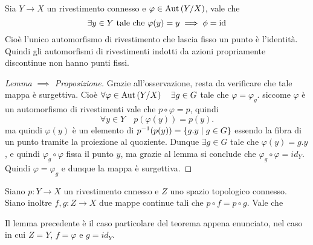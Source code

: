 \documentclass[]{article}
\begin{document}
\begin{lemma} \nl
    Sia $Y \to X$ un rivestimento connesso e $\varphi \in \mathrm{Aut}\left(Y/X\right)$, vale che
    \[
    \exists y \in Y \text{ tale che } \varphi(y) = y \implies \phi = \mathrm{id}
    \]
    Cio\`e l'unico automorfismo di rivestimento che lascia fisso un punto \`e l'identit\`a. \nl
    Quindi gli automorfismi di rivestimenti indotti da azioni propriamente discontinue non hanno punti fissi.
\end{lemma}

\begin{proof} [Lemma $\implies$ Proposizione] \nl
    Grazie all'osservazione, resta da verificare che tale mappa \`e surgettiva. \nl
    Cio\`e $\forall \varphi \in \mathrm{Aut}\left(Y/X\right) \quad \exists g \in G$ tale che $\varphi = \varphi_g$. \nl
    siccome $\varphi$ \`e un automorfismo di rivestimenti vale che $p \circ\varphi = p$, quindi
    \[\forall y \in Y \quad p(\varphi(y)) = p(y).\]
    ma quindi $\varphi(y)$ \`e un elemento di $p^{-1}(p(y)) = \left\{ g.y \mid g \in G \right\}$ essendo la fibra di un punto tramite la proiezione al quoziente. \nl
    Dunque $\exists g \in G$ tale che $\varphi(y) = g.y$, e quindi $\varphi_g \circ \varphi$ fissa il punto $y$, ma grazie al lemma si conclude che $\varphi_g \circ \varphi = id_Y$. \nl
    Quindi $\varphi = \varphi_g$ e dunque la mappa \`e surgettiva.
\end{proof}

\begin{proposition} \nl
    Siano $p: Y \to X$ un rivestimento cnnesso e $Z$ uno spazio topologico connesso. Siano inoltre 
    $f, g: Z \to X$ due mappe continue tali che $p \circ f = p \circ g$. Vale che 
\end{proposition}

\begin{remark} \nl
    Il lemma precedente \`e il caso particolare del teorema appena enunciato, nel caso in cui $Z = Y$, $f = \varphi$ e $g = id_Y$.
\end{remark}
\end{document}
